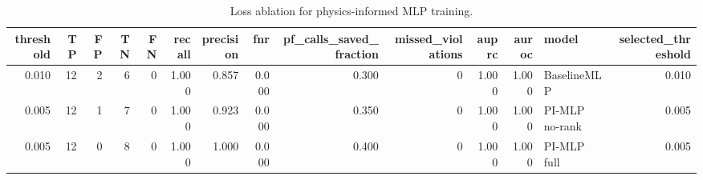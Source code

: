 \begin{table}
\caption{Loss ablation for physics-informed MLP training.}
\label{tab:ablation}
\begin{tabular}{rrrrrrrrrrrrlr}
\toprule
threshold & TP & FP & TN & FN & recall & precision & fnr & pf_calls_saved_fraction & missed_violations & auprc & auroc & model & selected_threshold \\
\midrule
0.010 & 12 & 2 & 6 & 0 & 1.000 & 0.857 & 0.000 & 0.300 & 0 & 1.000 & 1.000 & BaselineMLP & 0.010 \\
0.005 & 12 & 1 & 7 & 0 & 1.000 & 0.923 & 0.000 & 0.350 & 0 & 1.000 & 1.000 & PI-MLP no-rank & 0.005 \\
0.005 & 12 & 0 & 8 & 0 & 1.000 & 1.000 & 0.000 & 0.400 & 0 & 1.000 & 1.000 & PI-MLP full & 0.005 \\
\bottomrule
\end{tabular}
\end{table}
